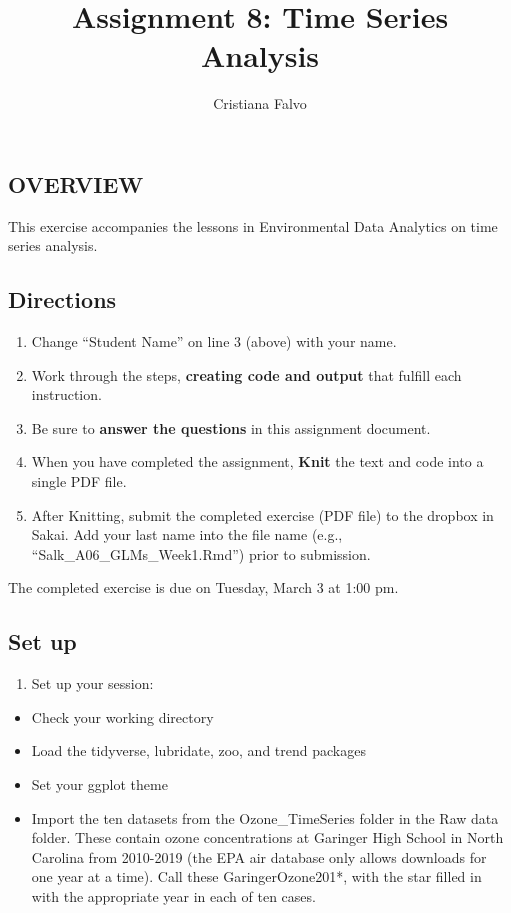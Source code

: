 \documentclass[]{article}
\title{Assignment 8: Time Series Analysis}
\author{Cristiana Falvo}
\date{}
\providecommand{\tightlist}{%
  \setlength{\itemsep}{0pt}\setlength{\parskip}{0pt}}
\begin{document}
\maketitle

\hypertarget{overview}{%
\subsection{OVERVIEW}\label{overview}}

This exercise accompanies the lessons in Environmental Data Analytics on
time series analysis.

\hypertarget{directions}{%
\subsection{Directions}\label{directions}}

\begin{enumerate}
\def\labelenumi{\arabic{enumi}.}
\tightlist
\item
  Change ``Student Name'' on line 3 (above) with your name.
\item
  Work through the steps, \textbf{creating code and output} that fulfill
  each instruction.
\item
  Be sure to \textbf{answer the questions} in this assignment document.
\item
  When you have completed the assignment, \textbf{Knit} the text and
  code into a single PDF file.
\item
  After Knitting, submit the completed exercise (PDF file) to the
  dropbox in Sakai. Add your last name into the file name (e.g.,
  ``Salk\_A06\_GLMs\_Week1.Rmd'') prior to submission.
\end{enumerate}

The completed exercise is due on Tuesday, March 3 at 1:00 pm.

\hypertarget{set-up}{%
\subsection{Set up}\label{set-up}}

\begin{enumerate}
\def\labelenumi{\arabic{enumi}.}
\tightlist
\item
  Set up your session:
\end{enumerate}

\begin{itemize}
\tightlist
\item
  Check your working directory
\item
  Load the tidyverse, lubridate, zoo, and trend packages
\item
  Set your ggplot theme
\item
  Import the ten datasets from the Ozone\_TimeSeries folder in the Raw
  data folder. These contain ozone concentrations at Garinger High
  School in North Carolina from 2010-2019 (the EPA air database only
  allows downloads for one year at a time). Call these
  GaringerOzone201*, with the star filled in with the appropriate year
  in each of ten cases.
\end{itemize}
\end{document}

